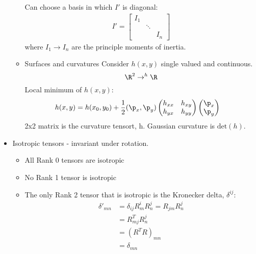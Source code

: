 \documentclass[cplx.tex]{subfiles}
\begin{document}
\begin{itemize}
\begin{itemize}
                Can choose a basis in which $I'$ is diagonal:
                \begin{align}
                    I' = \begin{bmatrix} I_1 & & \\ & \ddots & \\ & & I_n \end{bmatrix} 
                \end{align}
                where $I_1 \to I_n$ are the principle moments of inertia.
            \item Surfaces and curvatures
                Consider $h(x,y)$ single valued and continuous. 
                \begin{equation}
                    \R^2 \to^h \R
                \end{equation}
                Local minimum of $h(x,y)$:
                \begin{align}
                    h(x,y) &= h(x_0,y_0) + \frac{1}{2}(\p_x,\p_y)\begin{pmatrix} h_{xx} & h_{xy} \\ h_{yx} & h_{yy} \end{pmatrix} \begin{pmatrix} \p_x \\ \p_y \end{pmatrix}
                \end{align}
                2x2 matrix is the curvature tensort, h.
                Gaussian curvature is $\text{det}(h)$.
        \end{itemize}
    \item Isotropic tensors - invariant under rotation. 
        \begin{itemize}
            \item All Rank 0 tensors are isotropic
            \item No Rank 1 tensor is isotropic
            \item The only Rank 2 tensor that is isotropic is the Kronecker delta, $\delta^{ij}$:
                \begin{align}
                    \delta'_{mn} &= \delta_{ij}R^i_mR^j_n = R_{jm}R^j_n \\
                                 &= R^T_{mj}R^j_n \\
                                 &= (R^TR)_{mn} \\
                                 &= \delta_{mn}
                \end{align}
        \end{itemize}

\end{itemize}
\end{document}
